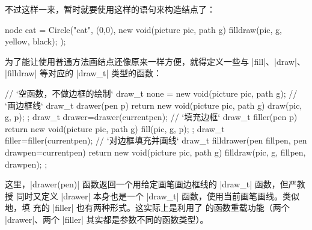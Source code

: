 不过这样一来，暂时就要使用这样的语句来构造结点了：
\begin{asycode}
node cat = Circle("cat", (0,0),
                  new void(picture pic, path g) {
                      filldraw(pic, g, yellow, black);
                  }
                 );
\end{asycode}
为了能让使用普通方法画结点还像原来一样方便，就得定义一些与 |fill|、|draw|、
|filldraw| 等对应的 |draw_t| 类型的函数：
\begin{asycode}
// `\color{comment}空函数，不做边框的绘制`
draw_t none = new void(picture pic, path g){};
// `\color{comment}画边框线`
draw_t drawer(pen p)
{
    return new void(picture pic, path g) {
        draw(pic, g, p);
    };
}
draw_t drawer=drawer(currentpen);
// `\color{comment}填充边框`
draw_t filler(pen p)
{
    return new void(picture pic, path g) {
        fill(pic, g, p);
    };
}
draw_t filler=filler(currentpen);
// `\color{comment}对边框填充并画线`
draw_t filldrawer(pen fillpen, pen drawpen=currentpen)
{
    return new void(picture pic, path g) {
        filldraw(pic, g, fillpen, drawpen);
    };
}
\end{asycode}
这里，|drawer(pen)| 函数返回一个用给定画笔画边框线的 |draw_t| 函数，但严教授
同时又定义 |drawer| 本身也是一个 |draw_t| 函数，使用当前画笔画线。类似地，填
充的 |filler| 也有两种形式。这实际上是利用了 \Asy{} 的函数重载功能（两个
|drawer|、两个 |filler| 其实都是参数不同的函数类型）。

